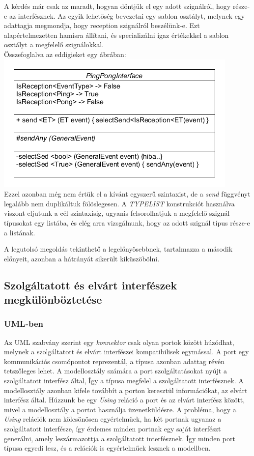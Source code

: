 \documentclass[a4paper,12pt]{report}
\begin{document}
\begin{enumerate}
A kérdés már csak az maradt, hogyan döntjük el egy adott szignálról, hogy része-e az interfésznek. Az egyik lehetőség bevezetni egy sablon osztályt, melynek egy adattagja megmondja, hogy reception szignálról beszélünk-e. Ezt alapértelmezetten hamisra állítani, és specializálni igaz értékekkel a sablon osztályt a megfelelő szignálokkal. \\
Összefoglalva az eddigieket egy ábrában: \\
\includegraphics[scale=0.8]{better_inf.png} \\
Ezzel azonban még nem értük el a kívánt egyszerű szintaxist, de a \textit{send} függvényt legalább nem duplikáltuk fölöslegesen. A \textit{TYPELIST} \cite{typelist} konstrukciót használva viszont eljutunk a cél szintaxisig, ugyanis felsorolhatjuk a megfelelő szignál típusokat egy listába, és elég arra vizsgálnunk, hogy az adott szignál típus része-e a listának.
\end{enumerate}

A legutolsó megoldás tekinthető a legelőnyösebbnek, tartalmazza a második előnyeit, azonban a hátrányát sikerült kiküszöbölni.

\subsection{Szolgáltatott és elvárt interfészek megkülönböztetése}
\subsubsection{UML-ben}
Az UML szabvány szerint egy \textit{konnektor} csak olyan portok között
húzódhat, melynek a szolgáltatott és elvárt interfészei kompatibilisek egymással.
A port egy kommunikációs csomópontot reprezentál, a típusa azonban adattag révén tetszőleges lehet.
A modellosztály számára a port szolgáltatásokat nyújt a szolgáltatott interfész által, Így a típusa megfelel a szolgáltatott interfésznek.
A modellosztály azonban kifele továbbít a porton keresztül információkat, az elvárt interfész által.
Húzzunk be egy \textit{Using} reláció a port és az elvárt interfész között, mivel a modellosztály a portot használja üzenetküldésre.
A probléma, hogy a \textit{Using} relációk nem kölcsönösen egyértelműek, ha két portnak ugyanaz a szolgáltatott interfésze, így
érdemes minden portnak egy saját interfészt generálni, amely leszármazottja a szolgáltatott interfésznek. Így minden port típusa egyedi lesz, és a relációk is egyértelműek lesznek a modellben.
\end{document}
